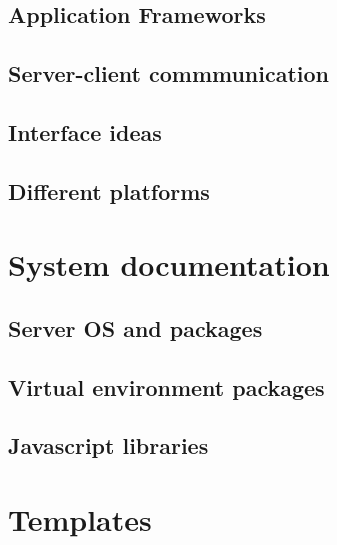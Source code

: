 \documentclass{report}
\begin{document}
\section{Application Frameworks}
\section{Server-client commmunication}
\section{Interface ideas}
\section{Different platforms}

\chapter{System documentation}
\section{Server OS and packages}
\section{Virtual environment packages}
\section{Javascript libraries}

\chapter{Templates}
\end{document}
